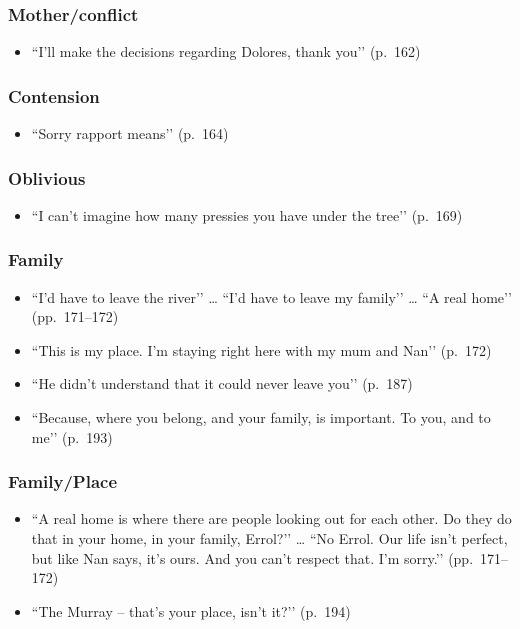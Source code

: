 \documentclass[a4paper]{article}
\begin{document}
\subsubsection{Mother/conflict}
\begin{itemize}
    \item ``I’ll make the decisions regarding Dolores, thank you’’ (p.~162)
\end{itemize}

\subsubsection{Contension}
\begin{itemize}
    \item ``Sorry rapport means’’ (p.~164)
\end{itemize}

\subsubsection{Oblivious}
\begin{itemize}
    \item ``I can’t imagine how many pressies you have under the tree’’ (p.~169)
\end{itemize}

\subsubsection{Family}
\begin{itemize}
    \item ``I’d have to leave the river’’ … ``I’d have to leave my family’’ … ``A real home’’ (pp.~171--172)
    \item ``This is my place. I’m staying right here with my mum and Nan’’ (p.~172)
    \item ``He didn’t understand that it could never leave you’’ (p.~187)
    \item ``Because, where you belong, and your family, is important. To you, and to me’’ (p.~193)
\end{itemize}

\subsubsection{Family/Place}
\begin{itemize}
    \item ``A real home is where there are people looking out for each other. Do they do that in your home, in your family, Errol?’’ … ``No Errol. Our life isn’t perfect, but like Nan says, it’s ours. And you can’t respect that. I’m sorry.’’ (pp.~171--172)
    \item ``The Murray – that’s your place, isn’t it?’’ (p.~194)
\end{itemize}
\end{document}
